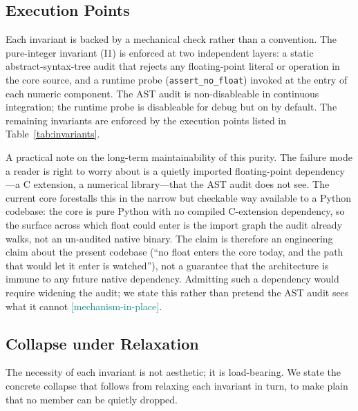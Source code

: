 \documentclass[11pt,a4paper]{article}
\newcommand{\statusmech}{\textcolor{teal}{\small\textsf{[mechanism-in-place]}}}
\begin{document}
\subsection{Execution Points}
\label{sec:invariants-exec}

Each invariant is backed by a mechanical check rather than a convention.
The pure-integer invariant (I1) is enforced at two independent layers:
a static abstract-syntax-tree audit that rejects any floating-point
literal or operation in the core source, and a runtime probe
(\texttt{assert\_no\_float}) invoked at the entry of each numeric
component. The AST audit is non-disableable in continuous integration;
the runtime probe is disableable for debug but on by default. The
remaining invariants are enforced by the execution points listed in
Table~\ref{tab:invariants}.

A practical note on the long-term maintainability of this purity. The
failure mode a reader is right to worry about is a quietly imported
floating-point dependency---a C extension, a numerical library---that
the AST audit does not see. The current core forestalls this in the
narrow but checkable way available to a Python codebase: the core is
pure Python with no compiled C-extension dependency, so the surface across
which float could enter is the import graph the audit already walks, not
an un-audited native binary. The claim is therefore an engineering claim
about the present codebase (``no float enters the core today, and the path
that would let it enter is watched''), not a guarantee that the
architecture is immune to any future native dependency. Admitting such a
dependency would require widening the audit; we state this rather than
pretend the AST audit sees what it cannot \statusmech.

\subsection{Collapse under Relaxation}
\label{sec:invariants-collapse}

The necessity of each invariant is not aesthetic; it is load-bearing. We
state the concrete collapse that follows from relaxing each invariant in
turn, to make plain that no member can be quietly dropped.
\end{document}
